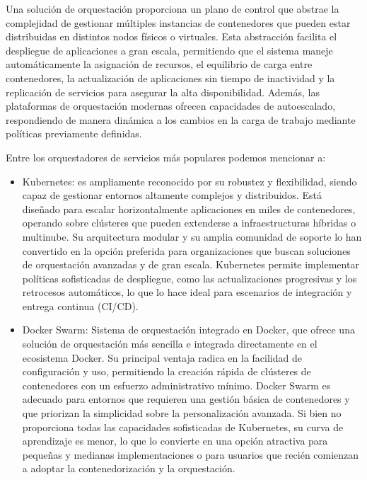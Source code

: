 {                Una solución de orquestación proporciona un plano de control que abstrae la complejidad de gestionar múltiples instancias de contenedores que pueden estar distribuidas en distintos nodos físicos o virtuales. Esta abstracción facilita el despliegue de aplicaciones a gran escala, permitiendo que el sistema maneje automáticamente la asignación de recursos, el equilibrio de carga entre contenedores, la actualización de aplicaciones sin tiempo de inactividad y la replicación de servicios para asegurar la alta disponibilidad. Además, las plataformas de orquestación modernas ofrecen capacidades de autoescalado, respondiendo de manera dinámica a los cambios en la carga de trabajo mediante políticas previamente definidas.
                
                Entre los orquestadores de servicios más populares podemos mencionar a:
                \begin{itemize}
                    \item Kubernetes: es ampliamente reconocido por su robustez y flexibilidad, siendo capaz de gestionar entornos altamente complejos y distribuidos. Está diseñado para escalar horizontalmente aplicaciones en miles de contenedores, operando sobre clústeres que pueden extenderse a infraestructuras híbridas o multinube. Su arquitectura modular y su amplia comunidad de soporte lo han convertido en la opción preferida para organizaciones que buscan soluciones de orquestación avanzadas y de gran escala. Kubernetes permite implementar políticas sofisticadas de despliegue, como las actualizaciones progresivas y los retrocesos automáticos, lo que lo hace ideal para escenarios de integración y entrega continua (CI/CD).
                    \item Docker Swarm: Sistema de orquestación integrado en Docker, que ofrece una solución de orquestación más sencilla e integrada directamente en el ecosistema Docker. Su principal ventaja radica en la facilidad de configuración y uso, permitiendo la creación rápida de clústeres de contenedores con un esfuerzo administrativo mínimo. Docker Swarm es adecuado para entornos que requieren una gestión básica de contenedores y que priorizan la simplicidad sobre la personalización avanzada. Si bien no proporciona todas las capacidades sofisticadas de Kubernetes, su curva de aprendizaje es menor, lo que lo convierte en una opción atractiva para pequeñas y medianas implementaciones o para usuarios que recién comienzan a adoptar la contenedorización y la orquestación.
                \end{itemize}

}
